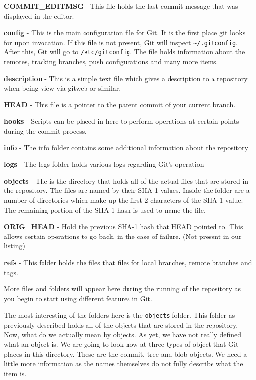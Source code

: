 \textbf{COMMIT\_EDITMSG} - This file holds the last commit message that was displayed in the editor.

\textbf{config} - This is the main configuration file for Git.
It is the first place git looks for upon invocation.
If this file is not present, Git will inspect \texttt{\textasciitilde/.gitconfig}.
After this, Git will go to \texttt{/etc/gitconfig}.
The file holds information about the remotes, tracking branches, push configurations and many more items.

\textbf{description} - This is a simple text file which gives a description to a repository when being view via gitweb or similar.

\textbf{HEAD} - This file is a pointer to the parent commit of your current branch.

\textbf{hooks} - Scripts can be placed in here to perform operations at certain points during the commit process.

\textbf{info} - The info folder contains some additional information about the repository

\textbf{logs} - The logs folder holds various logs regarding Git's operation

\textbf{objects} - The is the directory that holds all of the actual files that are stored in the repository.
The files are named by their SHA-1 values.
Inside the folder are a number of directories which make up the first 2 characters of the SHA-1 value.
The remaining portion of the SHA-1 hash is used to name the file.

\textbf{ORIG\_HEAD} - Hold the previous SHA-1 hash that HEAD pointed to.
This allows certain operations to go back, in the case of failure.
(Not present in our listing)

\textbf{refs} - This folder holds the files that files for local branches, remote branches and tags.

More files and folders will appear here during the running of the repository as you begin to start using different features in Git.

The most interesting of the folders here is the \texttt{objects} folder.
This folder as previously described holds all of the objects that are stored in the repository.
Now, what do we actually mean by objects.
As yet, we have not really defined what an object is.
We are going to look now at three types of object that Git places in this directory.
These are the commit, tree and blob objects.
We need a little more information as the names themselves do not fully describe what the item is.

